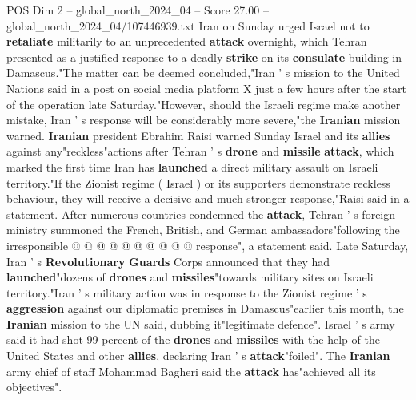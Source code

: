 \begin{textsample}{POS Dim 2 – global\_north\_2024\_04 – Score 27.00 – global\_north\_2024\_04/107446939.txt}  \label{ex:f2_pos_170}
Iran on Sunday urged Israel not to \textbf{retaliate} militarily to an unprecedented \textbf{attack} overnight, which Tehran presented as a justified response to a deadly \textbf{strike} on its \textbf{consulate} building in Damascus."The matter can be deemed concluded,"Iran ' s mission to the United Nations said in a post on social media platform X just a few hours after the start of the operation late Saturday."However, should the Israeli regime make another mistake, Iran ' s response will be considerably more severe,"the \textbf{Iranian} mission warned. \textbf{Iranian} president Ebrahim Raisi warned Sunday Israel and its \textbf{allies} against any"reckless"actions after Tehran ' s \textbf{drone} and \textbf{missile} \textbf{attack}, which marked the first time Iran has \textbf{launched} a direct military assault on Israeli territory."If the Zionist regime ( Israel ) or its supporters demonstrate reckless behaviour, they will receive a decisive and much stronger response,"Raisi said in a statement.
After numerous countries condemned the \textbf{attack}, Tehran ' s foreign ministry summoned the French, British, and German ambassadors"following the irresponsible @ @ @ @ @ @ @ @ @ @ response", a statement said.
Late Saturday, Iran ' s \textbf{Revolutionary} \textbf{Guards} Corps announced that they had \textbf{launched}"dozens of \textbf{drones} and \textbf{missiles}"towards military sites on Israeli territory."Iran ' s military action was in response to the Zionist regime ' s \textbf{aggression} against our diplomatic premises in Damascus"earlier this month, the \textbf{Iranian} mission to the UN said, dubbing it"legitimate defence".
Israel ' s army said it had shot 99 percent of the \textbf{drones} and \textbf{missiles} with the help of the United States and other \textbf{allies}, declaring Iran ' s \textbf{attack}"foiled".
The \textbf{Iranian} army chief of staff Mohammad Bagheri said the \textbf{attack} has"achieved all its objectives".

\end{textsample}
